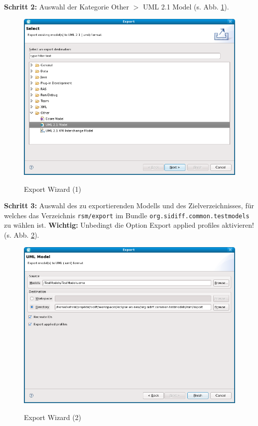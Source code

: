 \textbf{Schritt 2:} Auswahl der Kategorie Other $>$ UML 2.1 Model (s. Abb. \ref{img:export-wizard-1}).\\
\begin{figure}
	\centering
 	\includegraphics[scale=0.6]{img/export-wizard-1.png}
	\label{img:export-wizard-1}
	\caption{Export Wizard (1)}
\end{figure}

\textbf{Schritt 3:} Auswahl des zu exportierenden Modells und des Zielverzeichnisses, für welches das Verzeichnis \texttt{rsm/export} im Bundle \texttt{org.sidiff.common.testmodels} zu wählen ist. \textbf{Wichtig:} Unbedingt die Option Export applied profiles aktivieren! (s. Abb. \ref{img:export-wizard-2}).\\
\begin{figure}
	\centering
 	\includegraphics[scale=0.6]{img/export-wizard-2.png}
	\label{img:export-wizard-2}
	\caption{Export Wizard (2)}
\end{figure}


